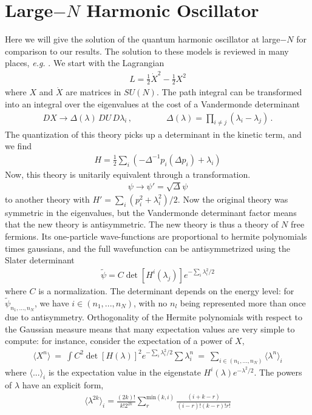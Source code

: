 \documentclass[a4paper,11pt]{article}
\numberwithin{equation}{section}
\begin{document}
\section{Large$-N$ Harmonic Oscillator}

Here we will give the solution of the quantum harmonic oscillator at large$-N$ for comparison to our results. The solution to these models is reviewed in many places, \textit{e.g.} \cite{Berenstein:2004kk}. We start with the Lagrangian 
%
\begin{align}
    L = \frac{1}{2} \dot X^2 - \frac{1}{2} X^2
\end{align}
%
where $X$ and $\dot X$ are matrices in $SU(N)$. The path integral can be transformed into an integral over the eigenvalues at the cost of a Vandermonde determinant 
%
\begin{align}
    D X \to \Delta(\lambda) \,  DU \,  D\lambda_i \, ,  \qquad \qquad \Delta(\lambda) = \prod_{i \neq j} (\lambda_i - \lambda_j) \, .
\end{align}
%
The quantization of this theory picks up a determinant in the kinetic term, and we find
%
\begin{align}
    H = \frac{1}{2} \sum_i \left( - \Delta^{-1} p_i (\Delta p_i) + \lambda_i \right) 
\end{align}
%
Now, this theory is unitarily equivalent through a transformation.
%
\begin{align}
    \psi \to \psi' = \sqrt{\Delta} \psi
\end{align}
%
to another theory with $H' = \sum_i (p_i^2 + \lambda_i^2)/2$. Now the original theory was symmetric in the eigenvalues, but the Vandermonde determinant factor means that the new theory is antisymmetric. The new theory is thus a theory of $N$ free fermions. Its one-particle wave-functions are proportional to hermite polynomials times gaussians, and the full wavefunction can be antisymmetrized using the Slater determinant
%
\begin{align}
    \tilde \psi = C \det [H^{i}(\lambda_j)] e^{- \sum_i \lambda_i^2 / 2}
\end{align}
%
where $C$ is a normalization. The determinant depends on the energy level: for $\tilde \psi_{n_1, ..., n_N}$, we have $i \in (n_1, ..., n_N)$, with no $n_l$ being represented more than once due to antisymmetry. Orthogonality of the Hermite polynomials with respect to the Gaussian measure means that many expectation values are very simple to compute: for instance, consider the expectation of a power of $X$,
%
\begin{align}
    \langle X^n \rangle \ =  \ \int C^2 \det[H(\lambda)]^2 e^{- \sum_i \lambda_i^2 / 2} \sum \lambda_i^n \ = \  \sum_{i \in (n_1, ..., n_N)} \langle \lambda^n \rangle_i
\end{align}
%
where $\langle ... \rangle_i$ is the expectation value in the eigenstate $H^i(\lambda) e^{-\lambda^2 / 2}$. The powers of $\lambda$ have an explicit form,
%
\begin{align}
    \langle \lambda^{2k} \rangle_i = \frac{(2k)!}{k! 2^{2k}} \sum_{r}^{\text{min} (k, i)} \frac{(i+k - r)}{(i-r)! (k-r)! r!}
\end{align}
\end{document}
